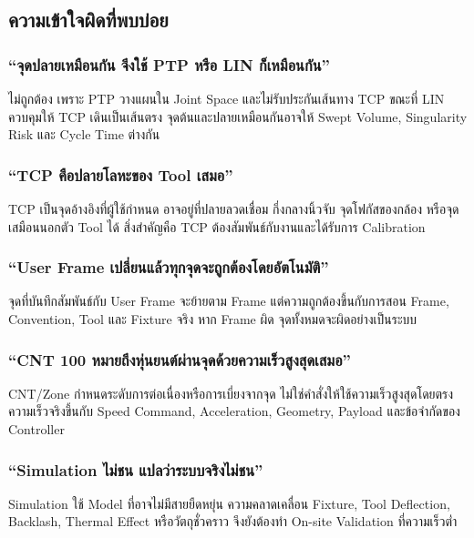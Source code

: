 \newpage

\subsection{ความเข้าใจผิดที่พบบ่อย}

\subsubsection{“จุดปลายเหมือนกัน จึงใช้ PTP หรือ LIN ก็เหมือนกัน”}

ไม่ถูกต้อง เพราะ PTP วางแผนใน Joint Space และไม่รับประกันเส้นทาง TCP ขณะที่ LIN ควบคุมให้ TCP เดินเป็นเส้นตรง จุดต้นและปลายเหมือนกันอาจให้ Swept Volume, Singularity Risk และ Cycle Time ต่างกัน

\subsubsection{“TCP คือปลายโลหะของ Tool เสมอ”}

TCP เป็นจุดอ้างอิงที่ผู้ใช้กำหนด อาจอยู่ที่ปลายลวดเชื่อม กึ่งกลางนิ้วจับ จุดโฟกัสของกล้อง หรือจุดเสมือนนอกตัว Tool ได้ สิ่งสำคัญคือ TCP ต้องสัมพันธ์กับงานและได้รับการ Calibration

\subsubsection{“User Frame เปลี่ยนแล้วทุกจุดจะถูกต้องโดยอัตโนมัติ”}

จุดที่บันทึกสัมพันธ์กับ User Frame จะย้ายตาม Frame แต่ความถูกต้องขึ้นกับการสอน Frame, Convention, Tool และ Fixture จริง หาก Frame ผิด จุดทั้งหมดจะผิดอย่างเป็นระบบ

\subsubsection{“CNT 100 หมายถึงหุ่นยนต์ผ่านจุดด้วยความเร็วสูงสุดเสมอ”}

CNT/Zone กำหนดระดับการต่อเนื่องหรือการเบี่ยงจากจุด ไม่ใช่คำสั่งให้ใช้ความเร็วสูงสุดโดยตรง ความเร็วจริงขึ้นกับ Speed Command, Acceleration, Geometry, Payload และข้อจำกัดของ Controller

\subsubsection{“Simulation ไม่ชน แปลว่าระบบจริงไม่ชน”}

Simulation ใช้ Model ที่อาจไม่มีสายยืดหยุ่น ความคลาดเคลื่อน Fixture, Tool Deflection, Backlash, Thermal Effect หรือวัตถุชั่วคราว จึงยังต้องทำ On-site Validation ที่ความเร็วต่ำ

